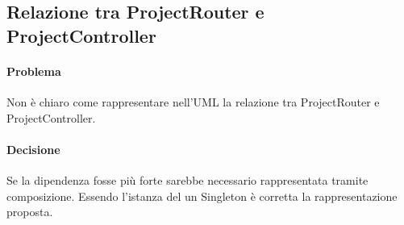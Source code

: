 \subsection{Relazione tra ProjectRouter e ProjectController}
\paragraph{Problema}
Non è chiaro come rappresentare nell’UML la relazione tra ProjectRouter e ProjectController.
\paragraph{Decisione}
Se la dipendenza fosse più forte sarebbe necessario rappresentata tramite composizione. Essendo l'istanza del  un Singleton è corretta la rappresentazione proposta.
